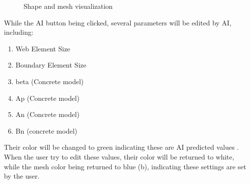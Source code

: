 \begin{figure}[!htbp]
  \centering 
    
  \caption{Shape and mesh visualization}
  \label{fig:shape}
\end{figure}


While the AI button being clicked, several parameters will be edited by AI, including:
\begin{enumerate}
\item Web Element Size
\item Boundary Element Size
\item beta (Concrete model)
\item Ap (Concrete model)
\item An (Concrete model)
\item Bn (concrete model)
\end{enumerate}
Their color will be changed to green indicating these are AI predicted values .
When the user try to edit these values, their color will be returned to white, 
while the mesh color being returned to blue  (b), 
indicating these settings are set by the user.

